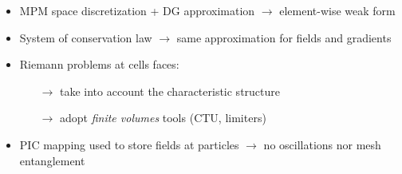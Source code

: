 \documentclass[11pt,aspectratio=169]{beamer}
\begin{document}
\begin{frame}[standout]{}
  \vspace{-.5cm}
  \begin{scriptsize}
      
  
    \begin{overprint}
      \vspace{-0.3cm}
      \begin{block}{\footnotesize {}}
      \vskip -6pt
        \begin{itemize}
        \item MPM space discretization + DG approximation $\rightarrow$ element-wise weak form
        \item System of conservation law $\rightarrow$ same approximation for fields and gradients
        \item Riemann problems at cells faces:
          \begin{itemize}
          \item[$\rightarrow$] \scriptsize take into account the characteristic structure 
          \item[$\rightarrow$] \scriptsize adopt \textit{finite volumes} tools (CTU, limiters) 
          \end{itemize}
        \item PIC mapping used to store fields at particles $\rightarrow$ no oscillations nor mesh entanglement
        \end{itemize}
      \end{block}
    

\end{overprint}
\end{scriptsize}
\end{frame}
\end{document}
